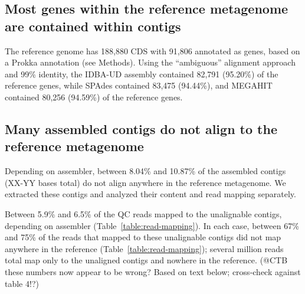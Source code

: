 \documentclass[10pt,a4paper,twocolumn]{article}
\begin{document}


\subsection*{Most genes within the reference metagenome are contained within contigs}

The reference genome has 188,880 CDS with 91,806 annotated as genes,
based on a Prokka annotation (see Methods).
Using the ``ambiguous'' alignment approach and 99\% identity, the
IDBA-UD assembly contained 82,791 (95.20\%) of the reference genes,
while SPAdes contained 83,475 (94.44\%), and
MEGAHIT contained 80,256 (94.59\%) of the reference genes.



\subsection*{Many assembled contigs do not align to the reference metagenome}

Depending on assembler, between 8.04\% and 10.87\% of the assembled
contigs (XX-YY bases total) do not align anywhere in the reference
metagenome.  We extracted these contigs and analyzed their content and
read mapping separately.


Between 5.9\% and 6.5\% of the QC reads mapped to the unalignable
contigs, depending on assembler (Table~\ref{table:read-mapping}).  In each case,
between 67\% and 75\% of the reads that mapped to these unalignable
contigs did not map anywhere in the reference
(Table~\ref{table:read-mapping}); several million reads total map only to
the unaligned contigs and nowhere in the reference. (@CTB these numbers now appear to be wrong? Based on text below; cross-check against table 4!?)
\end{document}
